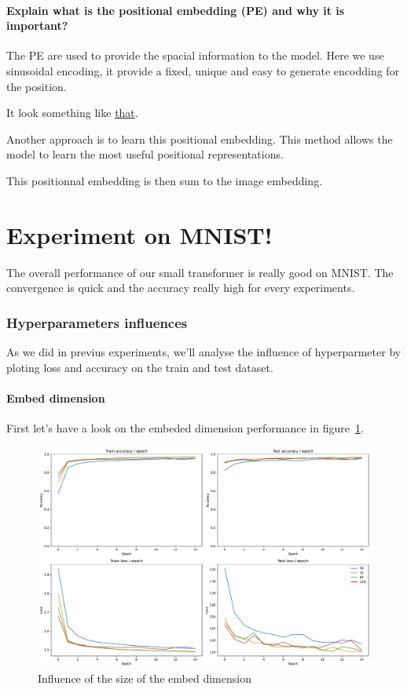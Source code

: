 \paragraph{Explain what is the positional embedding (PE) and why it is important?}
The PE are used to provide the spacial information to the model. Here we use sinusoidal encoding, it provide a fixed, unique and easy to generate encodding for the position. 

It look something like \href{https://miro.medium.com/v2/resize:fit:640/format:webp/1*erwsFgn3I-FGzUKOIeQSAw.png}{that}.

Another approach is to learn this positional embedding. This method allows the model to learn the most useful positional representations.

This positionnal embedding is then sum to the image embedding.

\section{Experiment on MNIST!}
The overall performance of our small transformer is really good on MNIST. The convergence is quick and the accuracy really high for every experiments.

\subsubsection{Hyperparameters influences}
As we did in previus experiments, we'll analyse the influence of hyperparmeter by ploting loss and accuracy on the train and test dataset.

\paragraph{Embed dimension}
First let's have a look on the embeded dimension performance in figure~\ref*{fig:embed_dim_influence}.

\begin{figure}[H]
    \centering
    \includegraphics*[width=\textwidth]{figs/Transformers/embed_dim_influence.pdf}
    \caption{Influence of the size of the embed dimension}
    \label{fig:embed_dim_influence}
\end{figure}

